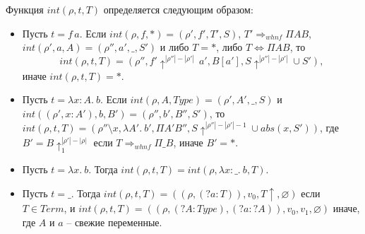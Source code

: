 \documentclass{amsart}
\theoremstyle{definition}
\theoremstyle{remark}
\newcommand{\red}{\Rightarrow}
\newcommand{\deq}{\Leftrightarrow}
\numberwithin{figure}{section}
\begin{document}
Функция $int(\rho,t,T)$ определяется следующим образом:
\begin{itemize}
\item Пусть $t = f\,a$.
    Если $int(\rho,f,*) = (\rho',f',T',S)$, $T' \red_{whnf} \Pi A B$, $int(\rho',a,A) = (\rho'',a',\_,S')$ и либо $T = *$, либо $T \deq \Pi A B$, то
    \[ int(\rho,t,T) = (\rho'', f'\!\uparrow^{|\rho''|-|\rho'|}\,a', B[a'], S\!\uparrow^{|\rho''|-|\rho'|} \cup S'), \]
    иначе $int(\rho,t,T) = *$.
\item Пусть $t = \lambda x : A.\ b$.
    Если $int(\rho,A,Type) = (\rho',A',\_,S)$ и $int((\rho',x:A'), b, B') = (\rho'',b',B'',S')$,
    то $int(\rho,t,T) = (\rho'' \setminus x, \lambda A'.\ b', \Pi A' B'', S\!\uparrow^{|\rho''|-|\rho'|-1} \cup abs(x,S'))$,
    где $B' = B\!\uparrow^{|\rho'|-|\rho|}_1$ если $T \red_{whnf} \Pi \_ B$, иначе $B' = *$.
\item Пусть $t = \lambda x.\ b$. Тогда $int(\rho,t,T) = int(\rho, \lambda x : \_.\ b, T)$.
\item Пусть $t = \_$. Тогда
    $int(\rho,t,T) = ((\rho,(?a:T)), v_0, T\!\uparrow, \varnothing)$ если $T \in Term$, и
    $int(\rho,t,T) = ((\rho,(?A:Type),(?a:?A)), v_0, v_1, \varnothing)$ иначе, где $A$ и $a$ -- свежие переменные.
\end{itemize}

\begin{comment}
Мы определяем функцию $int$ через вспомогательную функцию $apps : Env \times Term^{vc} \times (\{ I, E \} \times Term^{vc})^* \times (Term + 1) \to Term \times Term + 1$ как
\[ int(\rho, t, s) = apps(\rho, t, [], s). \]
Функция $apps$ определяется через функцию $int' : Env \times Term^{vc} \times (Term + 1) \to Term \times Term + 1$:
\begin{itemize}
\item $apps(\rho, t_1\,t_2, a, s) = apps(\rho, t_1, ((E, t_2), a), s)$.
\item $apps(\rho, t_1\,\{t_2\}, a, s) = apps(\rho, t_1, ((I, t_2), a), s)$.
\item $apps(\rho, t, a, s) = $ (TODO: закончить определение $apps$)
\end{itemize}
Функция $int'$ определяется индукцией по размеру второго аргумента (TODO: закончить определение $int'$):
\begin{itemize}
\item $int'(\rho, C\,\{ f_1 : D_1 \red d_1; \ldots f_n : D_n \red d_n \}, inr(*)) = inl(C\,\{ f'_1 : D'_1 \red d'_1; \ldots f'_k : D'_k \red d'_k \}, T)$, если
    $int'((\rho, (\mathbf{this}, C\,\{ f'_1 : D'_1 \red d'_1; \ldots f_{i-1} : D'_{i-1} \red d'_{i-1} \})), d_i, [], T_i) = inl(d'_i, T'_i)$
    для всех $1 \leq i \leq n$, где $T_i$ -- это тип поля $f_i$, а $T$ -- это максимум по типам всех полей, которых нет в списке $f_1$, \ldots $f_n$.
\item $int'(\rho, C\,\{ S \}, inl(A)) = inl(C', A')$, если $int'(\rho, C\,\{ S \}, inr(*)) = inl(C', A')$ и $A' \leq A$, иначе $int'(\rho, C\,\{ S \}, inl(A)) = inr(*)$.
\end{itemize}
\end{comment}



\end{document}
